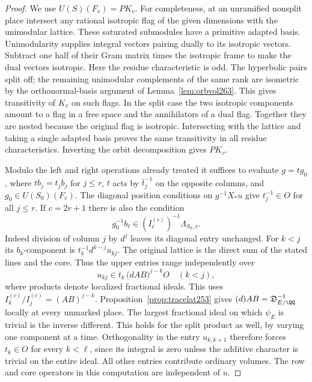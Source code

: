 \documentclass[a4paper,11pt]{article}
\theoremstyle{definition}
\theoremstyle{remark}
\numberwithin{equation}{section}
\begin{document}
\begin{proof}
We use \(U(S)(F_v)=PK_v\). For completeness, at an
unramified nonsplit place intersect any rational isotropic
flag of the given dimensions with the unimodular lattice.
These saturated submodules have a primitive adapted basis.
Unimodularity supplies integral vectors pairing dually to
its isotropic vectors. Subtract one half of their Gram matrix
times the isotropic frame to make the dual vectors isotropic.
Here the residue characteristic is odd. The hyperbolic pairs
split off; the remaining unimodular complements of the same
rank are isometric by the orthonormal-basis argument of
Lemma~\ref{lem:orbvol263}. This gives transitivity of \(K_v\)
on such flags. In the split case the two isotropic components
amount to a flag in a free space and the annihilators of a
dual flag. Together they are nested because the original
flag is isotropic. Intersecting with the lattice and taking a
single adapted basis proves the same transitivity in all
residue characteristics. Inverting the orbit decomposition
gives \(PK_v\).

Modulo the left and right operations already treated it
suffices to evaluate \(g=tg_0\), where \(t b_j=t_j b_j\)
for \(j\le r\), \(t\) acts by \(\bar t_j^{-1}\) on the opposite
columns, and \(g_0\in U(S_0)(F_v)\). The diagonal position
conditions on \(g^{-1}X_*u\) give \(t_j^{-1}\in O\) for all
\(j\le r\). If \(c=2r+1\) there is also the condition
\[
  g_0^{-1}b_\ell\in
       (I_\ell^{(c)})^{-1}\Lambda_{S_0,v}.
\]
Indeed division of column \(j\) by \(d^j\) leaves its diagonal
entry unchanged. For \(k<j\) its \(b_k\)-component is
\(t_k^{-1}d^{k-j}u_{kj}\). The original lattice is the direct
sum of the stated lines and the core. Thus the upper entries
range independently over
\[
       u_{kj}\in t_k\,\bigl(dAB\bigr)^{j-k}O\quad(k<j),
\]
where products denote localized fractional ideals.
This uses \(I_k^{(c)}/I_j^{(c)}=(AB)^{j-k}\).
Proposition~\ref{prop:tracelat253} gives
\((d)AB=\mathfrak D_{E/\QQ}^{-1}\) locally at every unmarked
place. The largest fractional ideal on which \(\psi_E\) is
trivial is the inverse different. This holds for the split
product as well, by varying one component at a time.
Orthogonality in the entry \(u_{k,k+1}\) therefore forces
\(t_k\in O\) for every \(k<\ell\), since its integral is zero
unless the additive character is trivial on the entire ideal.
All other entries contribute ordinary volumes. The row and
core operators in this computation are independent of \(u\).


\end{proof}
\end{document}
